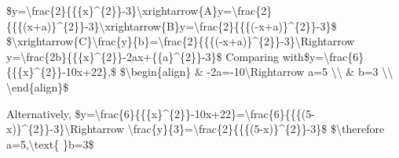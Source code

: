 \item \$y=\textbackslash frac\{2\}\{\{\{x\}\textasciicircum\{2\}\}-3\}\textbackslash xrightarrow\{A\}y=\textbackslash frac\{2\}\{\{\{(x+a)\}\textasciicircum\{2\}\}-3\}\textbackslash xrightarrow\{B\}y=\textbackslash frac\{2\}\{\{\{(-x+a)\}\textasciicircum\{2\}\}-3\}\$
\$\textbackslash xrightarrow\{C\}\textbackslash frac\{y\}\{b\}=\textbackslash frac\{2\}\{\{\{(-x+a)\}\textasciicircum\{2\}\}-3\}\textbackslash Rightarrow
y=\textbackslash frac\{2b\}\{\{\{x\}\textasciicircum\{2\}\}-2ax+\{\{a\}\textasciicircum\{2\}\}-3\}\$
Comparing with\$y=\textbackslash frac\{6\}\{\{\{x\}\textasciicircum\{2\}\}-10x+22\},\$
\$\textbackslash begin\{align\} \& -2a=-10\textbackslash Rightarrow
a=5 \textbackslash\textbackslash{} \& b=3 \textbackslash\textbackslash{}
\textbackslash end\{align\}\$

Alternatively, \$y=\textbackslash frac\{6\}\{\{\{x\}\textasciicircum\{2\}\}-10x+22\}=\textbackslash frac\{6\}\{\{\{(5-x)\}\textasciicircum\{2\}\}-3\}\textbackslash Rightarrow
\textbackslash frac\{y\}\{3\}=\textbackslash frac\{2\}\{\{\{(5-x)\}\textasciicircum\{2\}\}-3\}\$
\$\textbackslash therefore a=5,\textbackslash text\{ \}b=3\$